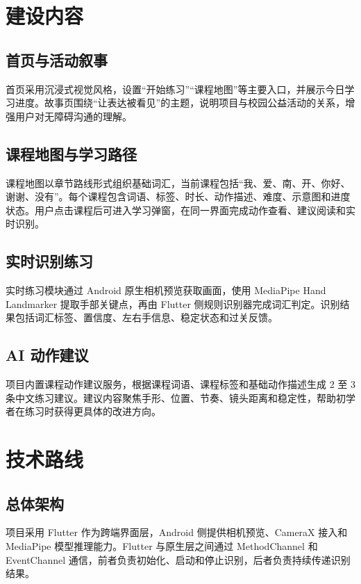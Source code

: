 \documentclass[UTF8,a4paper,12pt]{ctexart}
\begin{document}
\section{建设内容}

\subsection{首页与活动叙事}

首页采用沉浸式视觉风格，设置“开始练习”“课程地图”等主要入口，并展示今日学习进度。故事页围绕“让表达被看见”的主题，说明项目与校园公益活动的关系，增强用户对无障碍沟通的理解。

\subsection{课程地图与学习路径}

课程地图以章节路线形式组织基础词汇，当前课程包括“我、爱、南、开、你好、谢谢、没有”。每个课程包含词语、标签、时长、动作描述、难度、示意图和进度状态。用户点击课程后可进入学习弹窗，在同一界面完成动作查看、建议阅读和实时识别。

\subsection{实时识别练习}

实时练习模块通过 Android 原生相机预览获取画面，使用 MediaPipe Hand Landmarker 提取手部关键点，再由 Flutter 侧规则识别器完成词汇判定。识别结果包括词汇标签、置信度、左右手信息、稳定状态和过关反馈。

\subsection{AI 动作建议}

项目内置课程动作建议服务，根据课程词语、课程标签和基础动作描述生成 2 至 3 条中文练习建议。建议内容聚焦手形、位置、节奏、镜头距离和稳定性，帮助初学者在练习时获得更具体的改进方向。

\section{技术路线}

\subsection{总体架构}

项目采用 Flutter 作为跨端界面层，Android 侧提供相机预览、CameraX 接入和 MediaPipe 模型推理能力。Flutter 与原生层之间通过 MethodChannel 和 EventChannel 通信，前者负责初始化、启动和停止识别，后者负责持续传递识别结果。
\end{document}
